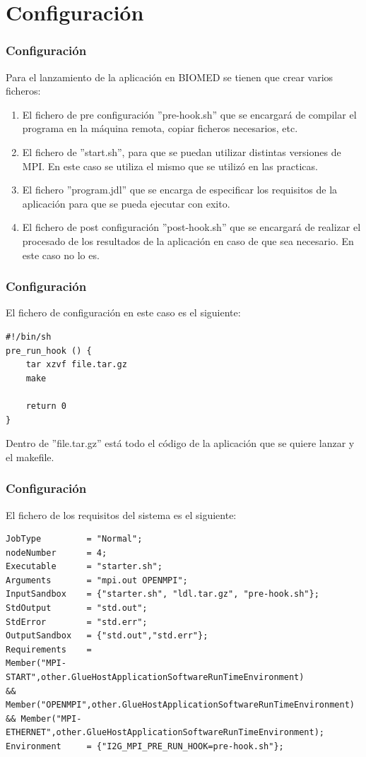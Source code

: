 \documentclass[10pt]{beamer}
\begin{document}
\section{Configuración}
\begin{frame}[fragile]
\frametitle{Configuración}

	Para el lanzamiento de la aplicación en BIOMED se tienen que crear varios ficheros:
    
\begin{enumerate}
\item El fichero de pre configuración ''pre-hook.sh'' que se encargará de compilar el programa en la máquina remota, copiar ficheros necesarios, etc.
\item El fichero de ''start.sh'', para que se puedan utilizar distintas versiones de MPI. En este caso se utiliza el mismo que se utilizó en las practicas.
\item El fichero ''program.jdl'' que se encarga de especificar los requisitos de la aplicación para que se pueda ejecutar con exito.
\item El fichero de post configuración ''post-hook.sh'' que se encargará de realizar el procesado de los resultados de la aplicación en caso de que sea necesario. En este caso no lo es.
\end{enumerate}
\end{frame}
\begin{frame}[fragile]
\frametitle{Configuración}
	El fichero de configuración en este caso es el siguiente:
\begin{lstlisting}[basicstyle=\ttfamily]
#!/bin/sh
pre_run_hook () {
    tar xzvf file.tar.gz
    make 
	
    return 0
}
\end{lstlisting}

Dentro de ''file.tar.gz'' está todo el código de la aplicación que se quiere lanzar y el makefile.

\end{frame}
\begin{frame}[fragile]
\frametitle{Configuración}
    El fichero de los requisitos del sistema es el siguiente:
\begin{lstlisting}[basicstyle=\ttfamily\tiny]
JobType         = "Normal";
nodeNumber      = 4;
Executable      = "starter.sh";
Arguments       = "mpi.out OPENMPI";
InputSandbox    = {"starter.sh", "ldl.tar.gz", "pre-hook.sh"};
StdOutput       = "std.out";
StdError        = "std.err";
OutputSandbox   = {"std.out","std.err"};
Requirements    =
Member("MPI-START",other.GlueHostApplicationSoftwareRunTimeEnvironment)
&& Member("OPENMPI",other.GlueHostApplicationSoftwareRunTimeEnvironment)
&& Member("MPI-ETHERNET",other.GlueHostApplicationSoftwareRunTimeEnvironment);
Environment 	= {"I2G_MPI_PRE_RUN_HOOK=pre-hook.sh"};

\end{lstlisting}
\end{frame}
\end{document}
